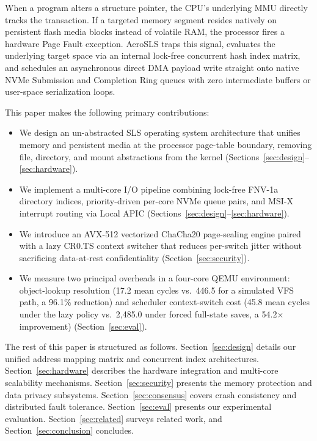 \documentclass[sigconf]{acmart}
\begin{document}
When a program alters a structure pointer, the CPU's underlying
MMU directly tracks the transaction.  If a targeted memory
segment resides natively on persistent flash media blocks instead
of volatile RAM, the processor fires a hardware Page Fault
exception.  AeroSLS traps this signal, evaluates the underlying
target space via an internal lock-free concurrent hash index
matrix, and schedules an asynchronous direct DMA payload write
straight onto native NVMe Submission and Completion Ring queues
with zero intermediate buffers or user-space serialization loops.

This paper makes the following primary contributions:
\begin{itemize}
  \item We design an un-abstracted SLS operating system
    architecture that unifies memory and persistent media at
    the processor page-table boundary, removing file, directory,
    and mount abstractions from the kernel
    (Sections~\ref{sec:design}--\ref{sec:hardware}).
  \item We implement a multi-core I/O pipeline combining
    lock-free FNV-1a directory indices, priority-driven
    per-core NVMe queue pairs, and MSI-X interrupt routing
    via Local APIC (Sections~\ref{sec:design}--\ref{sec:hardware}).
  \item We introduce an AVX-512 vectorized ChaCha20
    page-sealing engine paired with a lazy CR0.TS context
    switcher that reduces per-switch jitter without
    sacrificing data-at-rest confidentiality
    (Section~\ref{sec:security}).
  \item We measure two principal overheads in a four-core
    QEMU environment: object-lookup resolution (17.2 mean
    cycles vs.\ 446.5 for a simulated VFS path, a 96.1\%
    reduction) and scheduler context-switch cost (45.8 mean
    cycles under the lazy policy vs.\ 2,485.0 under forced
    full-state saves, a 54.2$\times$ improvement)
    (Section~\ref{sec:eval}).
\end{itemize}

The rest of this paper is structured as follows.
Section~\ref{sec:design} details our unified address mapping
matrix and concurrent index architectures.
Section~\ref{sec:hardware} describes the hardware integration
and multi-core scalability mechanisms.
Section~\ref{sec:security} presents the memory protection and
data privacy subsystems.
Section~\ref{sec:consensus} covers crash consistency and
distributed fault tolerance.
Section~\ref{sec:eval} presents our experimental evaluation.
Section~\ref{sec:related} surveys related work, and
Section~\ref{sec:conclusion} concludes.
\end{document}
